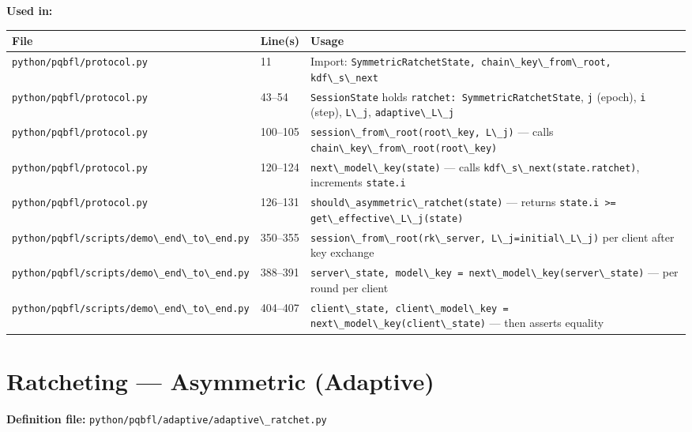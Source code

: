 \documentclass[11pt,a4paper]{article}
\newcommand{\code}[1]{\lstinline[basicstyle=\ttfamily\small]!#1!}
\begin{document}
\textbf{Used in:}

\begin{longtable}{L{5.5cm} L{2cm} L{6.8cm}}
\toprule
\textbf{File} & \textbf{Line(s)} & \textbf{Usage} \\
\midrule
\endhead
\bottomrule
\endfoot
\code{python/pqbfl/protocol.py}              & 11      & Import: \code{SymmetricRatchetState, chain\_key\_from\_root, kdf\_s\_next} \\
\code{python/pqbfl/protocol.py}              & 43--54  & \code{SessionState} holds \code{ratchet: SymmetricRatchetState}, \code{j} (epoch), \code{i} (step), \code{L\_j}, \code{adaptive\_L\_j} \\
\code{python/pqbfl/protocol.py}              & 100--105 & \code{session\_from\_root(root\_key, L\_j)} --- calls \code{chain\_key\_from\_root(root\_key)} \\
\code{python/pqbfl/protocol.py}              & 120--124 & \code{next\_model\_key(state)} --- calls \code{kdf\_s\_next(state.ratchet)}, increments \code{state.i} \\
\code{python/pqbfl/protocol.py}              & 126--131 & \code{should\_asymmetric\_ratchet(state)} --- returns \code{state.i >= get\_effective\_L\_j(state)} \\
\code{python/pqbfl/scripts/demo\_end\_to\_end.py} & 350--355 & \code{session\_from\_root(rk\_server, L\_j=initial\_L\_j)} per client after key exchange \\
\code{python/pqbfl/scripts/demo\_end\_to\_end.py} & 388--391 & \code{server\_state, model\_key = next\_model\_key(server\_state)} --- per round per client \\
\code{python/pqbfl/scripts/demo\_end\_to\_end.py} & 404--407 & \code{client\_state, client\_model\_key = next\_model\_key(client\_state)} --- then asserts equality \\
\end{longtable}

\section{Ratcheting --- Asymmetric (Adaptive)}

\textbf{Definition file:} \code{python/pqbfl/adaptive/adaptive\_ratchet.py}
\end{document}
